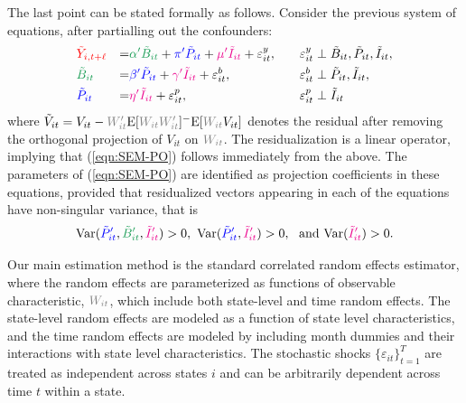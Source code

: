 \documentclass[11pt,reqno,letter]{amsart}
\theoremstyle{definition}
\providecommand{\Var}{{\mathrm{Var}}}
\newcommand{\Ep}{{\mathrm{E}}}
\def\bcolor{\color{ForestGreen}}
\def\pcolor{\color{blue}}
\def\icolor{\color{magenta}}
\def\wcolor{\color{gray}}
\def\ycolor{\color{red}}
\begin{document}
The last point can be stated formally as follows. Consider the previous system of equations, after partialling out the confounders:
\begin{equation}\label{eqn:SEM-PO}
 \begin{aligned}
   & {\ycolor { \tilde Y_{i,t+\ell}}}  & =& {\bcolor {\alpha ' \tilde B_{it}}} +{\pcolor {\pi '\tilde P_{it}}} +{\icolor \mu'\tilde I_{it} } + \varepsilon^y_{it},&\varepsilon^y_{it} &\perp {\tilde B_{it}}, {\tilde  P_{it}}, { \tilde I_{it}},  \\
   & {\bcolor { \tilde B_{it}}} & = &{\pcolor { \beta' \tilde P_{it}} } + {\icolor { \gamma' \tilde I_{it}} } + \varepsilon^b_{it},
   &\quad \varepsilon^b_{it} &\perp { \tilde P_{it}}, { \tilde I_{it}},  \\
   & {\pcolor { \tilde P_{it}} } &= &  {\icolor {\eta' \tilde I_{it}} } +   \varepsilon^p_{it}, &\quad \varepsilon^p_{it} &\perp {\tilde I_{it}}  \\
  \end{aligned}
\end{equation}
where $ \tilde V_{it} = V_{it}   -     {\wcolor W_{it}'} \Ep[{\wcolor W_{it}W_{it}'}]^{-} \Ep[{\wcolor W_{it}} V_{it}]$ denotes
the residual after removing the orthogonal projection of $V_{it}$ on ${\wcolor W_{it}}$. The residualization is a linear operator, implying that (\ref{eqn:SEM-PO}) follows immediately from the above. The parameters of (\ref{eqn:SEM-PO})  are identified as projection coefficients in these equations, provided that residualized vectors appearing in each of the equations have non-singular variance, that is
 \begin{equation}
 \Var ( {\pcolor \tilde P_{it}'} ,{\bcolor \tilde B_{it}'},{\icolor \tilde I_{it}'})>0,
 \ \Var ({\pcolor \tilde P_{it}'}, {\icolor \tilde I_{it}'})> 0 , \ \text{ and  }  \Var ( {\icolor \tilde I_{it}'}) >0.
 \end{equation}

Our main estimation method is the standard correlated random effects estimator, where the random effects
are parameterized as functions of observable characteristic, ${\wcolor W_{it}}$, which include both state-level and time random effects.  The state-level random effects
are modeled as a function of state level characteristics, and the time random effects are modeled
by including month dummies and their interactions with state level characteristics.  The stochastic shocks $\{ \varepsilon_{it}\}_{t=1}^T$
are treated as independent across states $i$ and can be arbitrarily dependent across time $t$ within a state.
\end{document}
